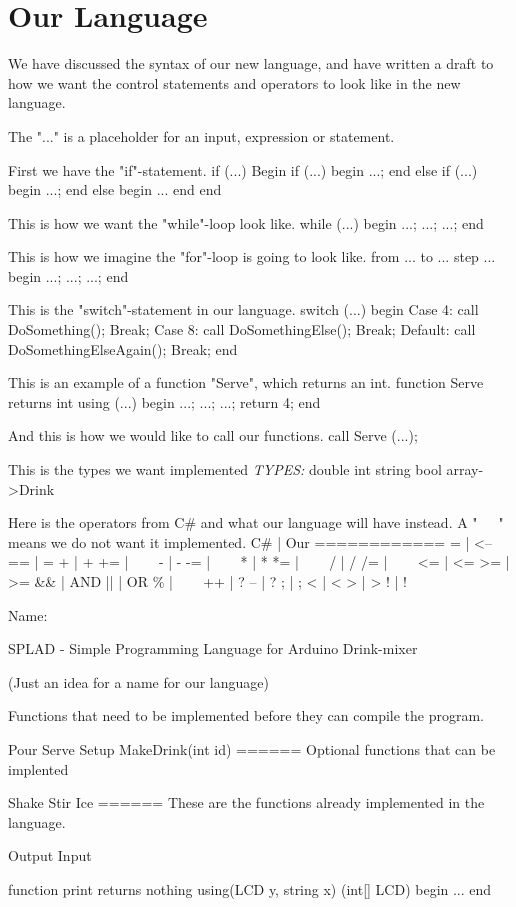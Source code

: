 \chapter{Our Language}
We have discussed the syntax of our new language, and have written a draft to how we want the control statements and operators to look like in the new language.

The "..." is a placeholder for an input, expression or statement.

First we have the "if"-statement.
if (...)
Begin
	if (...)
	begin
		...;
	end
	else if (...)
	begin
		...;
	end
	else
	begin
	...
	end
end

This is how we want the "while"-loop look like.
while (...)
begin
	...;
	...;
	...;
end
	
This is how we imagine the "for"-loop is going to look like.
from ... to ... step ...
begin
	...;
	...;
	...;
end

This is the "switch"-statement in our language.
switch (...)
begin
	Case 4:
		call DoSomething();
		Break;
	Case 8:
		call DoSomethingElse();
		Break;
	Default:
		call DoSomethingElseAgain();
	Break;
end

This is an example of a function "Serve", which returns an int.
function Serve returns int using (...)
begin
	...;
	...;
	...;
	return 4;
end

And this is how we would like to call our functions.
call Serve (...);

This is the types we want implemented
\textit{TYPES:}
double
int
string
bool
array->Drink

Here is the operators from C\# and what our language will have instead. A "~~~" means we do not want it implemented.
C\#	|	Our
============
=  	|	<--
==	|	=
+	|	+
+=	|	~~~
-	|	-
-=	|	~~~
*	|	*
*=	|	~~~
/	|	/
/=	|	~~~
<=	|	<=
>=	|	>=
&&	|	AND
||	|	OR
\%	|	~~~
++	|	?
--	|	?
;	|	;
<	|	<
>	|	>
!	|	!


Name:

SPLAD - Simple Programming Language for Arduino Drink-mixer


(Just an idea for a name for our language)







Functions that need to be implemented before they can compile the program.

Pour
Serve
Setup
MakeDrink(int id)
======
Optional functions that can be implented

Shake
Stir
Ice
======
These are the functions already implemented in the language.

Output
Input

function print returns nothing using(LCD y, string x)     (int[] LCD)
begin
	...
end